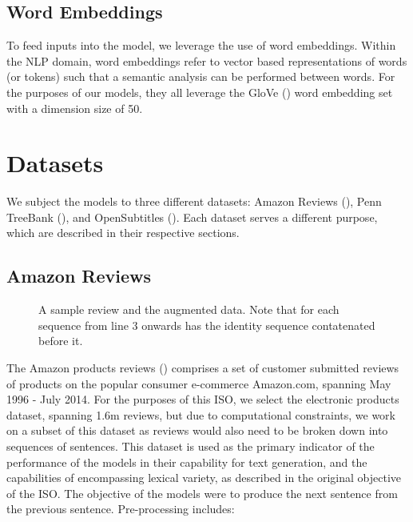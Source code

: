 \documentclass[12pt,twoside]{report}
\begin{document}
\subsection*{Word Embeddings}
\label{word_embeddings}

To feed inputs into the model, we leverage the use of word embeddings. Within the NLP domain, word embeddings refer to vector based representations of words (or tokens) such that a semantic analysis can be performed between words. For the purposes of our models, they all  leverage the GloVe (\cite{pennington_glove:_2014}) word embedding set with a dimension size of 50.

\section{Datasets}

We subject the models to three different datasets: Amazon Reviews (\cite{he_ups_2016}), Penn TreeBank (\cite{marcus_building_2002}), and OpenSubtitles (\cite{lison_opensubtitles2016:_2016}). Each dataset serves a different purpose, which are described in their respective sections.

\subsection{Amazon Reviews}

\begin{figure}[!ht]
	\centering
	
	
	\caption{A sample review and the augmented data. Note that for each sequence from line 3 onwards has the identity sequence contatenated before it. \label{ex_dataset:amazon}}
\end{figure}

The Amazon products reviews (\cite{he_ups_2016}) comprises a set of customer submitted reviews of products on the popular consumer e-commerce Amazon.com, spanning May 1996 - July 2014. For the purposes of this ISO, we select the electronic products dataset, spanning 1.6m reviews, but due to computational constraints, we work on a subset of this dataset as reviews would also need to be broken down into sequences of sentences. This dataset is used as the primary indicator of the performance of the models in their capability for text generation, and the capabilities of encompassing lexical variety, as described in the original objective of the ISO. The objective of the models were to produce the next sentence from the previous sentence. Pre-processing includes:
\end{document}
